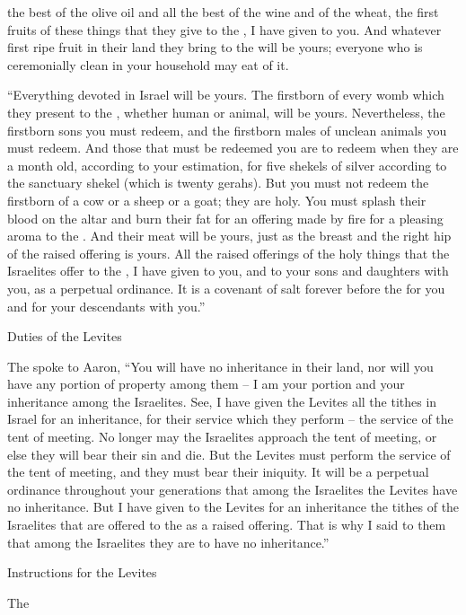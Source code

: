 {the best
of the olive oil
and all
the best
of the wine
and of the wheat,
the first fruits
of these things that
they give
to the
{}, I have given to you.
And whatever
first ripe fruit
in their land
they bring
to the
{}
will be
yours; everyone
who
is ceremonially clean
in your household
may eat of it.
\par }{\PP {}“Everything
devoted
in Israel
will be yours.
The firstborn
of every
womb
which
they present
to the
{}, whether human
or animal,
will be
yours. Nevertheless,
the firstborn sons
you must redeem,
and the firstborn
males
of unclean
animals
you must redeem.
And those that must be redeemed
you are to redeem
when they are a month
old,
according to your estimation,
for five
shekels
of silver
according to the sanctuary
shekel
(which
is twenty
gerahs).
But
you must not
redeem
the firstborn
of a cow
or
a sheep
or
a goat;
they are
holy.
You must
splash
their blood
on
the altar
and burn
their fat
for an offering made by fire
for a pleasing
aroma
to the
{}.
And their meat
will be yours, just as
the breast
and the right
hip
of the raised offering is yours.
All
the raised offerings
of the holy
things that
the Israelites
offer
to the
{}, I have given
to you, and to your sons
and daughters
with
you, as a perpetual
ordinance.
It is
a covenant
of salt
forever
before
the {}
for you and for your descendants
with you.”
\par }{\SH Duties of the Levites
\par }{\PP {}The
{}
spoke to
Aaron,
“You will have no
inheritance
in their land,
nor
will
you have any portion
of property among them – I am your portion and your inheritance among the Israelites.
See,
I have given
the Levites
all
the tithes
in Israel
for an inheritance,
for
their service
which
they
perform
– the service
of the tent
of meeting.
No
longer
may the Israelites
approach
the tent
of meeting,
or else they will bear
their sin
and die.
But
the Levites
must
perform
the service
of the tent
of meeting,
and they
must bear
their iniquity.
It will be a perpetual
ordinance
throughout your generations
that among
the Israelites
the Levites have no
inheritance.
But I have given
to the Levites
for
an inheritance
the
tithes
of the Israelites
that
are offered to the
{}
as a raised
offering.
That is why
I said
to them
that among
the Israelites
they are to have no
inheritance.”
\par }{\SH Instructions for the Levites
\par }{\PP {}The
}
